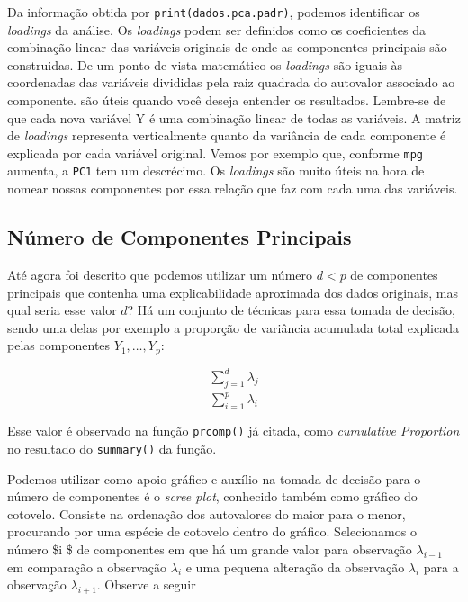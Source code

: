 \documentclass[
  letterpaper,
  DIV=11,
  numbers=noendperiod]{scrreprt}
\begin{document}
Da informação obtida por \texttt{print(dados.pca.padr)}, podemos
identificar os \emph{loadings} da análise. Os \emph{loadings} podem ser
definidos como os coeficientes da combinação linear das variáveis
originais de onde as componentes principais são construidas. De um ponto
de vista matemático os \emph{loadings} são iguais às coordenadas das
variáveis divididas pela raiz quadrada do autovalor associado ao
componente. são úteis quando você deseja entender os resultados.
Lembre-se de que cada nova variável Y é uma combinação linear de todas
as variáveis. A matriz de \emph{loadings} representa verticalmente
quanto da variância de cada componente é explicada por cada variável
original. Vemos por exemplo que, conforme \texttt{mpg} aumenta, a
\texttt{PC1} tem um descrécimo. Os \emph{loadings} são muito úteis na
hora de nomear nossas componentes por essa relação que faz com cada uma
das variáveis.

\hypertarget{nuxfamero-de-componentes-principais}{%
\subsection{Número de Componentes
Principais}\label{nuxfamero-de-componentes-principais}}

Até agora foi descrito que podemos utilizar um número \(d < p\) de
componentes principais que contenha uma explicabilidade aproximada dos
dados originais, mas qual seria esse valor \(d\)? Há um conjunto de
técnicas para essa tomada de decisão, sendo uma delas por exemplo a
proporção de variância acumulada total explicada pelas componentes
\(Y_1,\dots,Y_p\):

\[
\frac{\sum^d_{j=1}\lambda_j}{\sum_{i=1}^p \lambda_i}
\]

Esse valor é observado na função \texttt{prcomp()} já citada, como
\emph{cumulative Proportion} no resultado do \texttt{summary()} da
função.

Podemos utilizar como apoio gráfico e auxílio na tomada de decisão para
o número de componentes é o \emph{scree plot}, conhecido também como
gráfico do cotovelo. Consiste na ordenação dos autovalores do maior para
o menor, procurando por uma espécie de cotovelo dentro do gráfico.
Selecionamos o número \$i \$ de componentes em que há um grande valor
para observação \(\lambda_{i-1}\) em comparação a observação
\(\lambda_i\) e uma pequena alteração da observação \(\lambda_i\) para a
observação \(\lambda_{i+1}\). Observe a seguir
\end{document}
